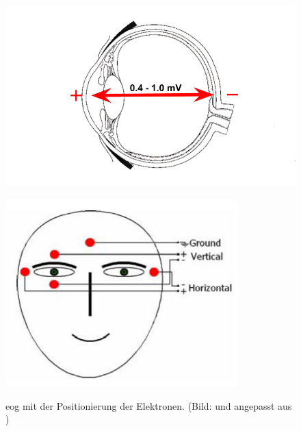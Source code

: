 \begin{description}
\begin{figure}[ht]
   \begin{minipage}[b]{0.5\linewidth} 
      \centering 
  \includegraphics[width=1\textwidth]{bilder/grundlagen/plusminus.png}
    \label{fig:pmsub1}
   \end{minipage}%
   \hfill
   \begin{minipage}[b]{0.5\linewidth} 
      \centering 
  \includegraphics[width=0.8\textwidth]{bilder/grundlagen/eog.png}
  \label{fig:pmsub2}
   \end{minipage}%
   \hfill
   \caption{\acf{eog} mit der Positionierung der Elektronen. (Bild: und  angepasst aus \cite[S.74]{Lupu2013})}\label{fig:plusminus} 
\end{figure} 


\end{description}
